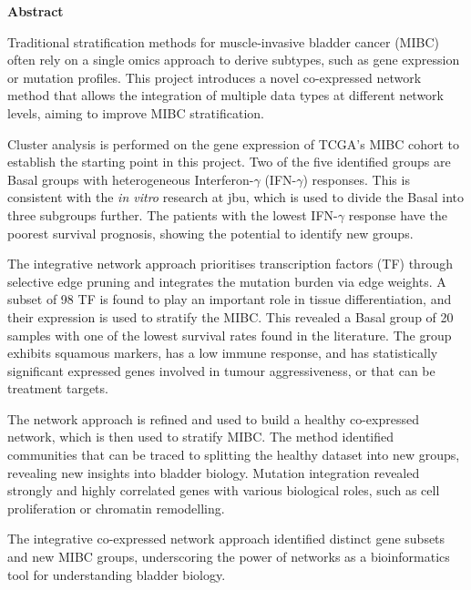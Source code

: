 \thispagestyle{plain}
\begin{center}
    \Large        
    \textbf{Abstract}
    \vspace{0.9cm}
\end{center}


Traditional stratification methods for muscle-invasive bladder cancer (MIBC) often rely on a single omics approach to derive subtypes, such as gene expression or mutation profiles. This project introduces a novel co-expressed network method that allows the integration of multiple data types at different network levels, aiming to improve MIBC stratification. 

Cluster analysis is performed on the gene expression of TCGA's MIBC cohort to establish the starting point in this project. Two of the five identified groups are Basal groups with heterogeneous Interferon-$\gamma$ (IFN-$\gamma$) responses. This is consistent with the \textit{in vitro} research at \acrlong{jbu}, which is used to divide the Basal into three subgroups further. The patients with the lowest IFN-$\gamma$ response have the poorest survival prognosis, showing the potential to identify new groups.


% 
The integrative network approach prioritises transcription factors (TF) through selective edge pruning and integrates the mutation burden via edge weights. A subset of 98 TF is found to play an important role in tissue differentiation, and their expression is used to stratify the MIBC. This revealed a Basal group of 20 samples with one of the lowest survival rates found in the literature. The group exhibits squamous markers, has a low immune response, and has statistically significant expressed genes involved in tumour aggressiveness, or that can be treatment targets.


%
The network approach is refined and used to build a healthy co-expressed network, which is then used to stratify MIBC. The method identified communities that can be traced to splitting the healthy dataset into new groups, revealing new insights into bladder biology. Mutation integration revealed strongly and highly correlated genes with various biological roles, such as cell proliferation or chromatin remodelling.


The integrative co-expressed network approach identified distinct gene subsets and new MIBC groups, underscoring the power of networks as a bioinformatics tool for understanding bladder biology.


\newpage
